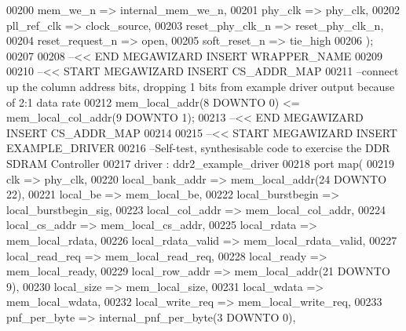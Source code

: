 \begin{DoxyCode}
{00200             mem_we_n => internal_mem_we_n,
00201             phy_clk => phy_clk,
00202             pll_ref_clk => clock_source,
00203             reset_phy_clk_n => reset_phy_clk_n,
00204             reset_request_n => \textcolor{keywordflow}{open},
00205             soft_reset_n => tie_high
00206     \textcolor{vhdlchar}{)};
00207 
00208 \textcolor{keyword}{  --<< END MEGAWIZARD INSERT WRAPPER\_NAME}
00209 
00210 \textcolor{keyword}{  --<< START MEGAWIZARD INSERT CS\_ADDR\_MAP}
00211 \textcolor{keyword}{  --connect up the column address bits, dropping 1 bits from example driver output because of 2:1 data rate}
00212   \textcolor{vhdlchar}{mem_local_addr}\textcolor{vhdlchar}{(}\textcolor{vhdllogic}{}\textcolor{vhdllogic}{8} \textcolor{keywordflow}{DOWNTO} \textcolor{vhdllogic}{}\textcolor{vhdllogic}{0}\textcolor{vhdlchar}{)} \textcolor{vhdlchar}{<=} \textcolor{vhdlchar}{mem_local_col_addr}\textcolor{vhdlchar}{(}\textcolor{vhdllogic}{}\textcolor{vhdllogic}{9} \textcolor{keywordflow}{DOWNTO} \textcolor{vhdllogic}{}\textcolor{vhdllogic}{1}\textcolor{vhdlchar}{)};
00213 \textcolor{keyword}{  --<< END MEGAWIZARD INSERT CS\_ADDR\_MAP}
00214 
00215 \textcolor{keyword}{  --<< START MEGAWIZARD INSERT EXAMPLE\_DRIVER}
00216 \textcolor{keyword}{  --Self-test, synthesisable code to exercise the DDR SDRAM Controller}
00217   driver : ddr2_example_driver
00218     \textcolor{keywordflow}{port} \textcolor{keywordflow}{map}(
00219             clk => phy_clk,
00220             local_bank_addr => mem_local_addr\textcolor{vhdlchar}{(}\textcolor{vhdllogic}{24} \textcolor{keywordflow}{DOWNTO} \textcolor{vhdllogic}{22}\textcolor{vhdlchar}{)},
00221             local_be => mem_local_be,
00222             local_burstbegin => local_burstbegin_sig,
00223             local_col_addr => mem_local_col_addr,
00224             local_cs_addr => mem_local_cs_addr,
00225             local_rdata => mem_local_rdata,
00226             local_rdata_valid => mem_local_rdata_valid,
00227             local_read_req => mem_local_read_req,
00228             local_ready => mem_local_ready,
00229             local_row_addr => mem_local_addr\textcolor{vhdlchar}{(}\textcolor{vhdllogic}{21} \textcolor{keywordflow}{DOWNTO} \textcolor{vhdllogic}{9}\textcolor{vhdlchar}{)},
00230             local_size => mem_local_size,
00231             local_wdata => mem_local_wdata,
00232             local_write_req => mem_local_write_req,
00233             pnf_per_byte => internal_pnf_per_byte\textcolor{vhdlchar}{(}\textcolor{vhdllogic}{3} \textcolor{keywordflow}{DOWNTO} \textcolor{vhdllogic}{0}\textcolor{vhdlchar}{)},
}
\end{DoxyCode}
